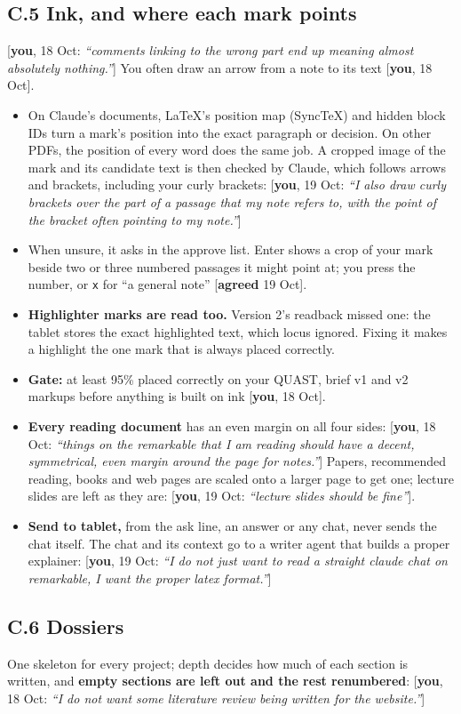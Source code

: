 \documentclass[10pt]{extarticle}
\newcommand{\you}[2]{{\small[\textbf{you}, #1: \textit{``#2''}]}}
\newcommand{\youx}[1]{{\small[\textbf{you}, #1]}}
\newcommand{\agreed}[1]{{\small[\textbf{agreed} #1]}}
\newcommand{\Sub}[1]{\subsection*{#1}}
\begin{document}
\Sub{C.5 Ink, and where each mark points}
\you{18 Oct}{comments linking to the wrong part end up meaning almost absolutely nothing.} You often draw an arrow from a note to its text \youx{18 Oct}.
\begin{itemize}
\item On Claude's documents, LaTeX's position map (SyncTeX) and hidden block IDs turn a mark's position into the exact paragraph or decision. On other PDFs, the position of every word does the same job. A cropped image of the mark and its candidate text is then checked by Claude, which follows arrows and brackets, including your curly brackets: \you{19 Oct}{I also draw curly brackets over the part of a passage that my note refers to, with the point of the bracket often pointing to my note.}
\item When unsure, it asks in the approve list. Enter shows a crop of your mark beside two or three numbered passages it might point at; you press the number, or \texttt{x} for ``a general note'' \agreed{19 Oct}.
\item \textbf{Highlighter marks are read too.} Version 2's readback missed one: the tablet stores the exact highlighted text, which locus ignored. Fixing it makes a highlight the one mark that is always placed correctly.
\item \textbf{Gate:} at least 95\% placed correctly on your QUAST, brief v1 and v2 markups before anything is built on ink \youx{18 Oct}.
\item \textbf{Every reading document} has an even margin on all four sides: \you{18 Oct}{things on the remarkable that I am reading should have a decent, symmetrical, even margin around the page for notes.} Papers, recommended reading, books and web pages are scaled onto a larger page to get one; lecture slides are left as they are: \you{19 Oct}{lecture slides should be fine}.
\item \textbf{Send to tablet,} from the ask line, an answer or any chat, never sends the chat itself. The chat and its context go to a writer agent that builds a proper explainer: \you{19 Oct}{I do not just want to read a straight claude chat on remarkable, I want the proper latex format.}
\end{itemize}

\Sub{C.6 Dossiers}
One skeleton for every project; depth decides how much of each section is written, and \textbf{empty sections are left out and the rest renumbered}: \you{18 Oct}{I do not want some literature review being written for the website.}
\end{document}

